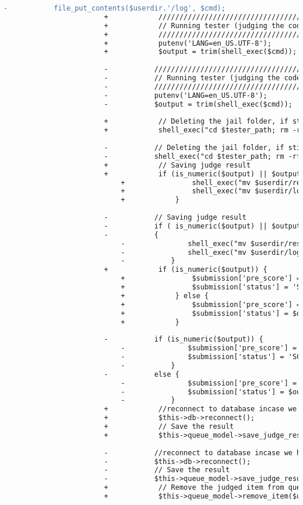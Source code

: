 \begin{lstlisting}[language=diff, caption=Perubahan pada kode Queueprocess.php]
						-			file_put_contents($userdir.'/log', $cmd);
						+            ///////////////////////////////////////
						+            // Running tester (judging the code) //
						+            ///////////////////////////////////////
						+            putenv('LANG=en_US.UTF-8');
						+            $output = trim(shell_exec($cmd));
						
						-			///////////////////////////////////////
						-			// Running tester (judging the code) //
						-			///////////////////////////////////////
						-			putenv('LANG=en_US.UTF-8');
						-			$output = trim(shell_exec($cmd));
						
						+            // Deleting the jail folder, if still exists
						+            shell_exec("cd $tester_path; rm -rf jail*");
						
						-			// Deleting the jail folder, if still exists
						-			shell_exec("cd $tester_path; rm -rf jail*");
						+            // Saving judge result
						+            if (is_numeric($output) || $output === 'Compilation Error' || $output === 'Syntax Error') {
							+                shell_exec("mv $userdir/result.html $userdir/result-{$submit_id}.html");
							+                shell_exec("mv $userdir/log $userdir/log-{$submit_id}");
							+            }
						
						-			// Saving judge result
						-			if ( is_numeric($output) || $output === 'Compilation Error' || $output === 'Syntax Error' )
						-			{
							-				shell_exec("mv $userdir/result.html $userdir/result-{$submit_id}.html");
							-				shell_exec("mv $userdir/log $userdir/log-{$submit_id}");
							-			}
						+            if (is_numeric($output)) {
							+                $submission['pre_score'] = $output;
							+                $submission['status'] = 'SCORE';
							+            } else {
							+                $submission['pre_score'] = 0;
							+                $submission['status'] = $output;
							+            }
						
						-			if (is_numeric($output)) {
							-				$submission['pre_score'] = $output;
							-				$submission['status'] = 'SCORE';
							-			}
						-			else {
							-				$submission['pre_score'] = 0;
							-				$submission['status'] = $output;
							-			}
						+            //reconnect to database incase we have run test for a long time.
						+            $this->db->reconnect();
						+            // Save the result
						+            $this->queue_model->save_judge_result_in_db($submission, $type);
						
						-			//reconnect to database incase we have run test for a long time.
						-			$this->db->reconnect();
						-			// Save the result
						-			$this->queue_model->save_judge_result_in_db($submission, $type);
						+            // Remove the judged item from queue
						+            $this->queue_model->remove_item($username, $assignment, $problem['id'], $submit_id);
						

\end{lstlisting}
